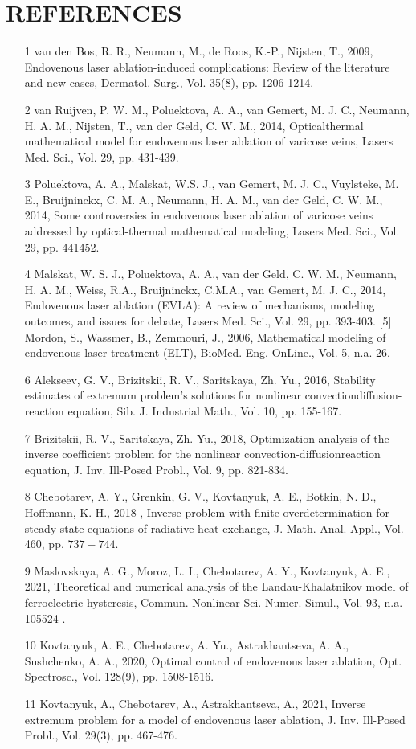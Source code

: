 \documentclass[10pt]{article}
\begin{document}
\section{REFERENCES}
\begin{enumerate}
\item [1] van den Bos, R. R., Neumann, M., de Roos, K.-P., Nijsten, T., 2009,
Endovenous laser ablation-induced complications: Review of the literature and new cases,
Dermatol. Surg., Vol. 35(8), pp. 1206-1214.
\item [2] van Ruijven, P. W. M., Poluektova, A. A., van Gemert, M. J. C., Neumann, H. A. M., Nijsten, T.,
van der Geld, C. W. M., 2014, Opticalthermal mathematical model for endovenous laser
ablation of varicose veins, Lasers Med. Sci., Vol. 29, pp. 431-439.
\item [3] Poluektova, A. A., Malskat, W.S. J., van Gemert, M. J. C.,
Vuylsteke, M. E., Bruijninckx, C. M. A., Neumann, H. A. M., van der Geld, C. W. M., 2014,
Some controversies in endovenous laser ablation of varicose veins addressed by
optical-thermal mathematical modeling, Lasers Med. Sci., Vol. 29, pp. 441452.
\item [4] Malskat, W. S. J., Poluektova, A. A.,
van der Geld, C. W. M., Neumann, H. A. M., Weiss, R.A., Bruijninckx,
C.M.A., van Gemert, M. J. C., 2014, Endovenous laser ablation (EVLA):
A review of mechanisms, modeling outcomes, and issues for debate,
Lasers Med. Sci., Vol. 29, pp. 393-403. [5] Mordon, S., Wassmer, B., Zemmouri, J., 2006,
Mathematical modeling of endovenous laser treatment (ELT), BioMed. Eng. OnLine., Vol. 5, n.a. 26.
\item [6] Alekseev, G. V., Brizitskii, R. V., Saritskaya, Zh. Yu., 2016,
Stability estimates of extremum problem's solutions for nonlinear convectiondiffusion-reaction
equation, Sib. J. Industrial Math., Vol. 10, pp. 155-167.
\item [7] Brizitskii, R. V., Saritskaya, Zh. Yu., 2018,
Optimization analysis of the inverse coefficient problem for the nonlinear
convection-diffusionreaction equation, J. Inv. Ill-Posed Probl., Vol. 9, pp. 821-834.
\item [8] Chebotarev, A. Y., Grenkin, G. V., Kovtanyuk,
A. E., Botkin, N. D., Hoffmann, K.-H., 2018 ,
Inverse problem with finite overdetermination for steady-state equations
of radiative heat exchange, J. Math. Anal. Appl., Vol. 460, pp. $737-744$.
\item [9] Maslovskaya, A. G., Moroz, L. I., Chebotarev, A. Y., Kovtanyuk, A. E., 2021,
Theoretical and numerical analysis of the Landau-Khalatnikov model of ferroelectric hysteresis,
Commun. Nonlinear Sci. Numer. Simul., Vol. 93, n.a. 105524 .
\item [10] Kovtanyuk, A. E., Chebotarev, A. Yu.,
Astrakhantseva, A. A., Sushchenko, A. A., 2020,
Optimal control of endovenous laser ablation, Opt. Spectrosc., Vol. 128(9), pp. 1508-1516.
\item [11] Kovtanyuk, A., Chebotarev, A., Astrakhantseva, A., 2021,
Inverse extremum problem for a model of endovenous laser ablation,
J. Inv. Ill-Posed Probl., Vol. 29(3), pp. 467-476.
\end{enumerate}
\end{document}
